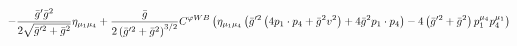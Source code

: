 %
\begin{dmath*}
%
  -  \frac{{\bar g}^\prime {\bar g}{}^2}{2 \sqrt{{\bar g}^{\prime 2} + {\bar g}{}^2}}\eta_{\mu_1 \mu_4}  +  \frac{{\bar g}{}}{2 \left({\bar g}^{\prime 2} + {\bar g}{}^2\right)^{3/2}}C^{ \varphi  WB} \left(\eta_{\mu_1 \mu_4} \left({\bar g}^{\prime 2} \left(4 p_{1}\nobreak\cdot\nobreak{}p_{4} + {\bar g}{}^2 v^2\right) + 4 {\bar g}{}^2 p_{1}\nobreak\cdot\nobreak{}p_{4}\right) - 4 \left({\bar g}^{\prime 2} + {\bar g}{}^2\right) p_1^{\mu_4} p_4^{\mu_1}\right)
%
\end{dmath*}
%
